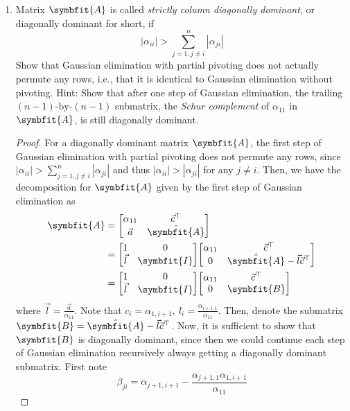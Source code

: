 \documentclass{article}
\theoremstyle{definition}
\newcommand{\mat}[1]{\symbfit{#1}}
\begin{document}
\begin{enumerate}[leftmargin=\labelsep]
	\item Matrix \(\mat{A}\) is called \emph{strictly column diagonally dominant}, or diagonally dominant for short, if
	      \begin{equation}
		      |\alpha_{ii}| > \sum_{j=1, j \neq i}^{n} |\alpha_{ji}| \label{eq:diagdom}
	      \end{equation}
	      Show that Gaussian elimination with partial pivoting does not actually permute any rows, i.e., that it is identical to Gaussian elimination without pivoting. Hint: Show that after one step of Gaussian elimination, the trailing \((n - 1)\text{-by-}(n - 1)\) submatrix, the \emph{Schur complement} of \(\alpha_{11}\) in \(\mat{A}\), is still diagonally dominant.
	      \begin{proof}
		      For a diagonally dominant matrix \(\mat{A}\), the first step of Gaussian elimination with partial pivoting does not permute any rows, since \(|\alpha_{ii}| > \sum_{j=1, j \neq i}^{n} |\alpha_{ji}|\) and thus \(|\alpha_{ii}| > |\alpha_{ji}|\) for any \(j\neq i\). Then, we have the decomposition for \(\mat{A}\) given by the first step of Gaussian elimination as
		      \begin{align*}
			      \mat{A} & = \mqty[\alpha_{11} & \vec{c}^{\top} \\ \vec{a} & \hat{\mat{A}}]                                                                          \\
			              & = \mqty[1           & 0              \\ \vec{l} & \mat{I}] \mqty[\alpha_{11} & \vec{c}^{\top} \\ 0 & \hat{\mat{A}}-\vec{l}\vec{c}^{\top}] \\
			              & = \mqty[1           & 0              \\ \vec{l} & \mat{I}] \mqty[\alpha_{11} & \vec{c}^{\top} \\ 0 & \mat{B}]                             \\
		      \end{align*}
		      where \(\vec{l} = \frac{\vec{a}}{\alpha_{11}}\). Note that \(c_i = \alpha_{1,i + 1},\ l_i = \frac{\alpha_{i + 1, 1}}{\alpha_{11}}\). Then, denote the submatrix \(\mat{B}=\hat{\mat{A}}-\vec{l}\vec{c}^{\top}\). Now, it is sufficient to show that \(\mat{B}\) is diagonally dominant, since then we could continue each step of Gaussian elimination recursively always getting a diagonally dominant submatrix. First note
		      \begin{equation}
			      \beta_{ji} = \alpha_{j+1,i+1} - \frac{\alpha_{j+1,1}\alpha_{1,i+1}}{\alpha_{11}} \label{eq:bji}

\end{equation}
\end{proof}
\end{enumerate}
\end{document}
